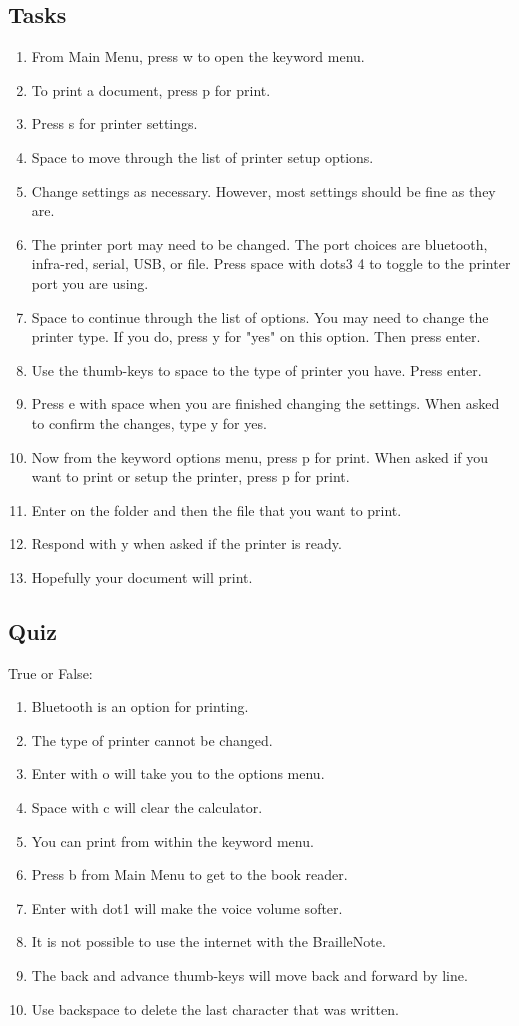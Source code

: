 \documentclass[10pt,letterpaper,twoside]{report}
\begin{document}
{{{\subsection{Tasks}
\begin{enumerate}
	\item From Main Menu, press w to open the keyword menu.
	\item To print a document, press p for print.
	\item Press s for printer settings.
	\item Space to move through the list of printer setup options.
	\item Change settings as necessary.  However, most settings should be fine as they are.
	\item The printer port may need to be changed.  The port choices are bluetooth, infra-red, serial, USB, or file.  Press space with dots3 4 to toggle to the printer port you are using.
	\item Space to continue through the list of options.  You may need to change the printer type. If you do, press y for "yes" on this option.  Then press enter.
	\item Use the thumb-keys to space to the type of printer you have.  Press enter.
	\item Press e with space when you are finished changing the settings.  When asked to confirm the changes, type y for yes.
	\item Now from the keyword options menu, press p for print.  When asked if you want to print or setup the printer, press p for print.
	\item Enter on the folder and then the file that you want to print.
	\item Respond with y when asked if the printer is ready.
	\item Hopefully your document will print.
\end{enumerate}
\clearpage
\subsection{Quiz}
True or False:
\begin{enumerate}
	\item Bluetooth is an option for printing.
	\item The type of printer cannot be changed.
	\item Enter with o will take you to the options menu.
	\item Space with c will clear the calculator.
	\item You can print from within the keyword menu.
	\item Press b from Main Menu to get to the book reader.
	\item Enter with dot1 will make the voice volume softer.
	\item It is not possible to use the internet with the BrailleNote.
	\item The back and advance thumb-keys will move back and forward by line.
	\item Use backspace to delete the last character that was written.
\end{enumerate}

}}}
\end{document}
